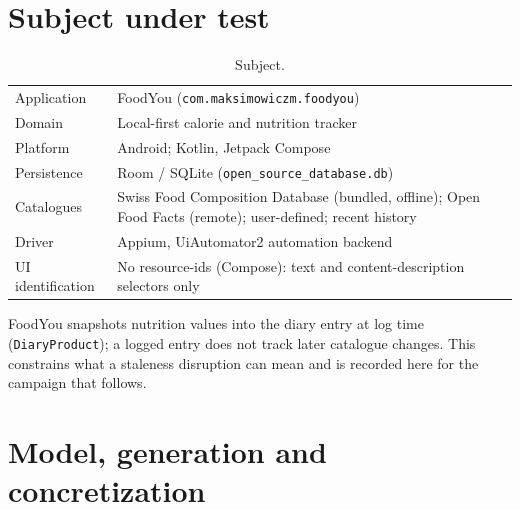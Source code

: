 \documentclass[11pt,a4paper]{article}
\begin{document}
\section{Subject under test}

\begin{table}[h]
\centering\footnotesize
\caption{Subject.}
\begin{tabular}{@{}ll@{}}
\toprule
Application & FoodYou (\texttt{com.maksimowiczm.foodyou}) \\
Domain & Local-first calorie and nutrition tracker \\
Platform & Android; Kotlin, Jetpack Compose \\
Persistence & Room / SQLite (\texttt{open\_source\_database.db}) \\
Catalogues & Swiss Food Composition Database (bundled, offline); Open Food Facts
(remote); user-defined; recent history \\
Driver & Appium, UiAutomator2 automation backend \\
UI identification & No resource-ids (Compose): text and content-description
selectors only \\
\bottomrule
\end{tabular}
\end{table}

FoodYou snapshots nutrition values into the diary entry at log time
(\texttt{DiaryProduct}); a logged entry does not track later catalogue changes.
This constrains what a staleness disruption can mean and is recorded here for the
campaign that follows.

\section{Model, generation and concretization}
\end{document}
